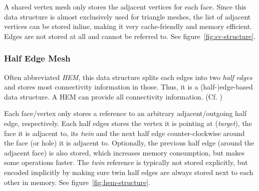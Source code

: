 A shared vertex mesh only stores the adjacent vertices for each face.
Since this data structure is almost exclusively used for triangle meshes, the list of adjacent vertices can be stored inline, making it very cache-friendly and memory efficient.
Edges are not stored at all and cannot be referred to. See figure~\ref{fig:sv-structure}.


\subsubsection*{Half Edge Mesh}

Often abbreviated \emph{HEM}, this data structure splits each edges into two \emph{half edges} and stores most connectivity information in those. Thus, it is a (half-)edge-based data structure.
A HEM can provide all connectivity information. (Cf. \cite{mantyla1988introduction})

Each face/vertex only stores a reference to an arbitrary adjacent/outgoing half edge, respectively.
Each half edges stores the vertex it is pointing at (\emph{target}), the face it is adjacent to, its \emph{twin} and the next half edge counter-clockwise around the face (or hole) it is adjacent to.
Optionally, the previous half edge (around the adjacent face) is also stored, which increases memory consumption, but makes some operations faster.
The \emph{twin} reference is typically not stored explicitly, but encoded implicitly by making sure twin half edges are always stored next to each other in memory.
See figure~\ref{fig:hem-structure}.

